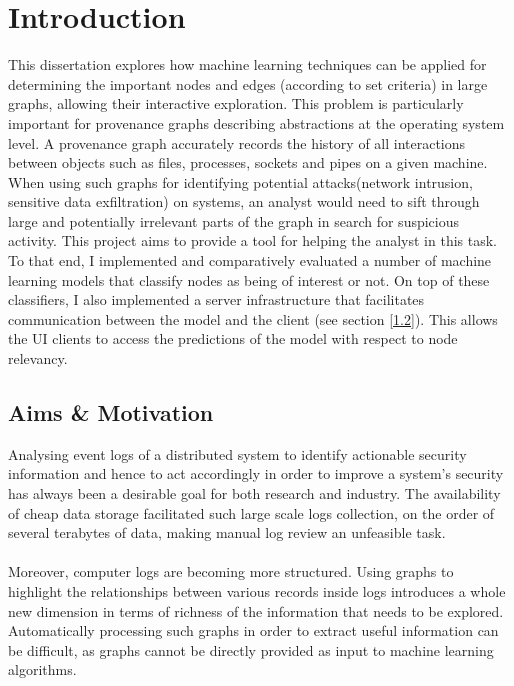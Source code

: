 
	
	\chapter{Introduction}
	
	This dissertation explores how machine learning techniques can be applied for determining the important nodes and edges (according to set criteria) in large graphs, allowing their interactive exploration. This problem is particularly important for provenance graphs describing abstractions at the operating system level. A provenance graph accurately records the history of all interactions between objects such as files, processes, sockets and pipes on a given machine. When using such graphs for identifying potential attacks(network intrusion, sensitive data exfiltration) on systems, an analyst would need to sift through large and potentially irrelevant parts of the graph in search for suspicious activity. This project aims to provide a tool for helping the analyst in this task. To that end, I implemented and comparatively evaluated a number of machine learning models that classify nodes as being of interest or not. On top of these classifiers, I also implemented a server infrastructure that facilitates communication between the model and the client (see section \ref{1.2}). This allows the UI clients to access the predictions of the model with respect to node relevancy. 
	
	\section{Aims \& Motivation}  \label{1.1}
	Analysing event logs of a distributed system to identify actionable security information and hence to act accordingly in order to improve a system's security has always been a desirable goal for both research and industry. The availability of cheap data storage facilitated such large scale logs collection, on the order of several terabytes of data, making manual log review an unfeasible task. 
	\\ \\
	Moreover, computer logs are becoming more structured. Using graphs to highlight the relationships between various records inside logs introduces a whole new dimension in terms of richness of the information that needs to be explored. Automatically processing such graphs in order to extract useful information can be difficult, as graphs cannot be directly provided as input to machine learning algorithms.
	

